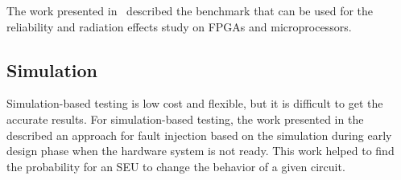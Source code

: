The work presented in~\cite{quinn2015using} described the benchmark that can be used for the reliability and radiation effects study on FPGAs and microprocessors. 

%
%        
%        
%




\subsection{Simulation}

Simulation-based testing is low cost and flexible, but it is difficult to get the accurate results. For simulation-based testing, the work presented in the~\citep{violante2004simulation} described an approach for fault injection based on the simulation during early design phase when the hardware system is not ready.  This work helped to find the probability for an SEU to change the behavior of a given circuit.

